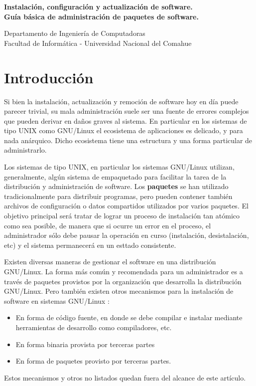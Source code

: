 \documentclass[12pt]{article}
\def\maketitle{

 \makeatletter
 {\color{bl} \centering \huge \sc \textbf{
  Instalación, configuración y actualización de software.\\ 
\large \vspace*{-8pt} \color{black} Guía básica de administración de paquetes de software. 
 \vspace*{8pt} }\par}
 \makeatother

\makeatletter
 {\centering \small 
 	Departamento de Ingeniería de Computadoras \\
 	Facultad de Informática - Universidad Nacional del Comahue \\
 	\vspace{20pt} }
 \makeatother

}
\begin{document}
\thispagestyle{empty}
\maketitle
\setlength{\parindent}{0pt}

\section*{Introducción}

Si bien la instalación, actualización y remoción de software hoy en día
puede parecer trivial, su mala administración suele ser una fuente de 
errores complejos que pueden derivar en daños graves al sistema. 
En particular en los sistemas de tipo UNIX como GNU/Linux el ecosistema
de aplicaciones es delicado, y para nada anárquico. Dicho ecosistema tiene 
una estructura y una forma particular de administrarlo. 

Los sistemas de tipo UNIX, en particular los sistemas GNU/Linux utilizan,
generalmente, algún sistema de empaquetado para facilitar la tarea de la 
distribución y administración de software.
Los {\bf paquetes} se han utilizado tradicionalmente para distribuir 
programas, pero pueden contener también archivos de configuración
o datos compartidos utilizados por varios paquetes. El objetivo principal
será tratar de lograr un proceso de instalación tan atómico como sea 
posible, de manera que si ocurre un error en el proceso, el administrador
sólo debe pausar la operación en curso (instalación, desistalación, etc)
y el sistema permanecerá en un esttado consistente.

Existen diversas maneras de gestionar el software en una distribución 
GNU/Linux. La forma más común y recomendada para un administrador es a 
través de paquetes provistos por la organización que desarrolla la 
distribución GNU/Linux.  Pero también existen otros mecanismos para la 
instalación de software en sistemas GNU/Linux :

\begin{itemize}
\item En forma de código fuente, en donde se debe compilar e instalar 
mediante herramientas de desarrollo como compiladores, etc. 
\item En forma binaria provista por terceras partes
\item En forma de paquetes provisto por terceras partes. 
\end{itemize}

Estos mecanismos y otros no listados quedan fuera del alcance de este 
artículo.
\end{document}
